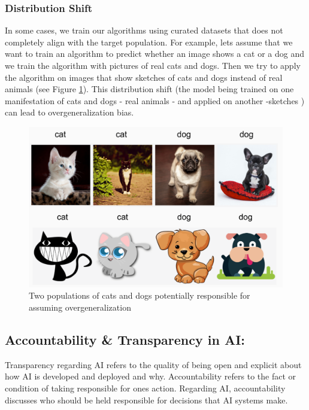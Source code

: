 \documentclass[
]{book}
\begin{document}
\subsubsection{Distribution Shift}\label{distribution-shift}

In some cases, we train our algorithms using curated datasets that does not completely align with the target population. For example, lets assume that we want to train an algorithm to predict whether an image shows a cat or a dog and we train the algorithm with pictures of real cats and dogs. Then we try to apply the algorithm on images that show sketches of cats and dogs instead of real animals (see Figure \ref{fig:catsanddogs}). This distribution shift (the model being trained on one manifestation of cats and dogs - real animals - and applied on another -sketches ) can lead to overgeneralization bias.

\begin{figure}
\includegraphics[width=13cm]{./images/catsanddogs} \caption{Two populations of cats and dogs potentially responsible for assuming overgeneralization}\label{fig:catsanddogs}
\end{figure}

\subsection{Accountability \& Transparency in AI:}\label{accountability-transparency-in-ai}

Transparency regarding AI refers to the quality of being open and explicit about how AI is developed and deployed and why.
Accountability refers to the fact or condition of taking responsible for ones action. Regarding AI, accountability discusses who should be held responsible for decisions that AI systems make.
\end{document}
